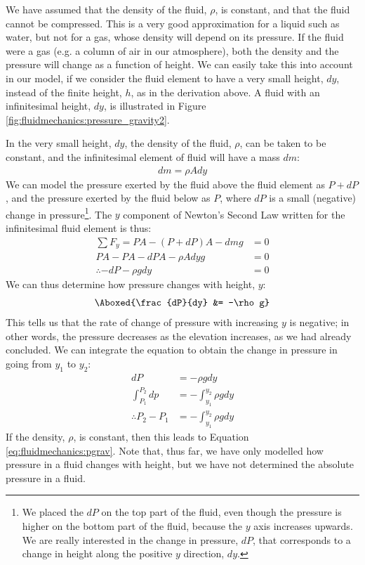 We have assumed that the density of the fluid, $\rho$, is constant, and that the fluid cannot be compressed. This is a very good approximation for a liquid such as water, but not for a gas, whose density will depend on its pressure. If the fluid were a gas (e.g. a column of air in our atmosphere), both the density and the pressure will change as a function of height. We can easily take this into account in our model, if we consider the fluid element to have a very small height, $dy$, instead of the finite height, $h$, as in the derivation above. A fluid with an infinitesimal height, $dy$, is illustrated in Figure \ref{fig:fluidmechanics:pressure_gravity2}.

 In the very small height, $dy$, the density of the fluid, $\rho$, can be taken to be constant, and the infinitesimal element of fluid will have a mass $dm$:
\begin{align*}
dm = \rho A dy
\end{align*}
We can model the pressure exerted by the fluid above the fluid element as $P+dP$, and the pressure exerted by the fluid below as $P$, where $dP$ is a small (negative) change in pressure\footnote{We placed the $dP$ on the top part of the fluid, even though the pressure is higher on the bottom part of the fluid, because the $y$ axis increases upwards. We are really interested in the change in pressure, $dP$, that corresponds to a change in height along the positive $y$ direction, $dy$. }. The $y$ component of Newton's Second Law written for the infinitesimal fluid element is thus:
\begin{align*}
\sum F_y = PA - (P+dP)A -dm g &=0\\
PA -PA -dPA - \rho A dy g &=0\\
\therefore -dP -\rho gdy &=0
\end{align*}
We can thus determine how pressure changes with height, $y$:
\begin{align}
\Aboxed{\frac{dP}{dy} &= -\rho g}
\end{align}
This tells us that the rate of change of pressure with increasing $y$ is negative; in other words, the pressure decreases as the elevation increases, as we had already concluded. We can integrate the equation to obtain the change in pressure in going from $y_1$ to $y_2$:
\begin{align*}
dP &= -\rho g dy\\
\int_{P_1}^{P_2} dp&=-\int_{y_1}^{y_2}\rho gdy\\
\therefore P_2-P_1 &=-\int_{y_1}^{y_2}\rho gdy
\end{align*}
If the density, $\rho$, is constant, then this leads to Equation \ref{eq:fluidmechanics:pgrav}. Note that, thus far, we have only modelled how pressure in a fluid changes with height, but we have not determined the absolute pressure in a fluid. 

